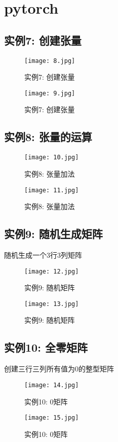\documentclass[a4paper, 12pt]{article}
\begin{document}
          \section{pytorch}
          \subsection{实例7: 创建张量}
          \begin{figure}[h!]
            \centering
            \texttt{[image: 8.jpg]}
            \caption{实例7: 创建张量 }
          \end{figure}
          \begin{figure}[h!]
            \centering
            \texttt{[image: 9.jpg]}
            \caption{实例7: 创建张量 }
          \end{figure}
    
          \subsection{实例8: 张量的运算}
          \begin{figure}[h!]
            \centering
            \texttt{[image: 10.jpg]}
            \caption{实例8: 张量加法}
          \end{figure}
          \begin{figure}[h!]
            \centering
            \texttt{[image: 11.jpg]}
            \caption{实例8: 张量加法}
          \end{figure}
          \newpage
          \subsection{实例9: 随机生成矩阵}
          随机生成一个3行3列矩阵
          \begin{figure}[h!]
            \centering
            \texttt{[image: 12.jpg]}
            \caption{实例9: 随机矩阵}
          \end{figure}
          \begin{figure}[h!]
            \centering
            \texttt{[image: 13.jpg]}
            \caption{实例9: 随机矩阵}
          \end{figure}
          \subsection{实例10: 全零矩阵}
          创建三行三列所有值为0的整型矩阵
          \begin{figure}[h!]
            \centering
            \texttt{[image: 14.jpg]}
            \caption{实例10: 0矩阵}
          \end{figure}
          \begin{figure}[h!]
            \centering
            \texttt{[image: 15.jpg]}
            \caption{实例10: 0矩阵}
          \end{figure}
\end{document}
